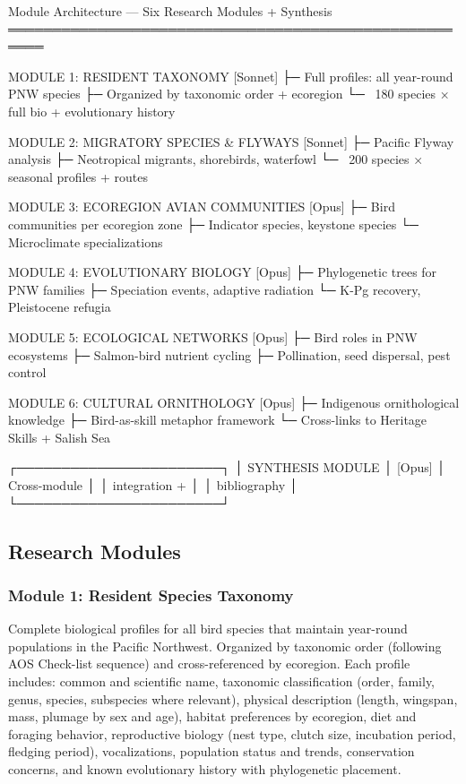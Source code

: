 \documentclass[11pt,letterpaper]{article}
\begin{document}
\begin{asciibox}
Module Architecture — Six Research Modules + Synthesis
══════════════════════════════════════════════════════

MODULE 1: RESIDENT TAXONOMY                  [Sonnet]
├─ Full profiles: all year-round PNW species
├─ Organized by taxonomic order + ecoregion
└─ ~180 species × full bio + evolutionary history

MODULE 2: MIGRATORY SPECIES & FLYWAYS        [Sonnet]
├─ Pacific Flyway analysis
├─ Neotropical migrants, shorebirds, waterfowl
└─ ~200 species × seasonal profiles + routes

MODULE 3: ECOREGION AVIAN COMMUNITIES        [Opus]
├─ Bird communities per ecoregion zone
├─ Indicator species, keystone species
└─ Microclimate specializations

MODULE 4: EVOLUTIONARY BIOLOGY               [Opus]
├─ Phylogenetic trees for PNW families
├─ Speciation events, adaptive radiation
└─ K-Pg recovery, Pleistocene refugia

MODULE 5: ECOLOGICAL NETWORKS                [Opus]
├─ Bird roles in PNW ecosystems
├─ Salmon-bird nutrient cycling
├─ Pollination, seed dispersal, pest control

MODULE 6: CULTURAL ORNITHOLOGY               [Opus]
├─ Indigenous ornithological knowledge
├─ Bird-as-skill metaphor framework
└─ Cross-links to Heritage Skills + Salish Sea

         ┌───────────────────────┐
         │  SYNTHESIS MODULE     │  [Opus]
         │  Cross-module         │
         │  integration +        │
         │  bibliography         │
         └───────────────────────┘
\end{asciibox}

\subsection{Research Modules}

\subsubsection{Module 1: Resident Species Taxonomy}
Complete biological profiles for all bird species that maintain year-round populations in the Pacific Northwest. Organized by taxonomic order (following AOS Check-list sequence) and cross-referenced by ecoregion. Each profile includes: common and scientific name, taxonomic classification (order, family, genus, species, subspecies where relevant), physical description (length, wingspan, mass, plumage by sex and age), habitat preferences by ecoregion, diet and foraging behavior, reproductive biology (nest type, clutch size, incubation period, fledging period), vocalizations, population status and trends, conservation concerns, and known evolutionary history with phylogenetic placement.
\end{document}
